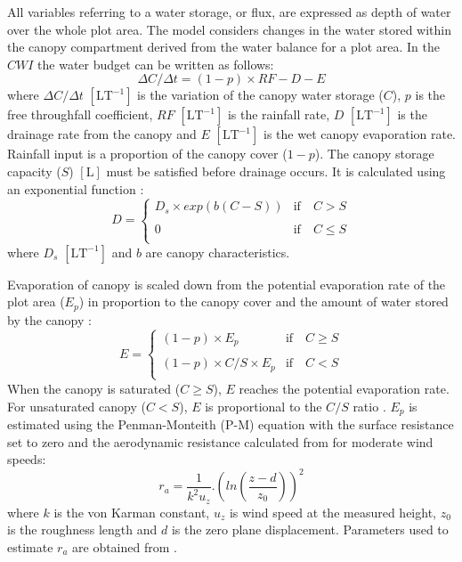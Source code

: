 \documentclass[a4paper,12pt]{article}
\begin{document}
All variables referring to a water storage, or flux, are expressed as depth of water over the whole plot area.
The model considers changes in the water stored within the canopy compartment derived from the water balance for a plot area. In the $CWI$ the water budget can be written as follows:
\begin{equation} \label{eq:fog_can_bal}
    \Delta C/\Delta t = (1 - p) \times RF - D - E 
\end{equation}
where $\Delta C/\Delta t$ $\mathrm{[LT^{-1}]}$ is the variation of the canopy water storage ($C$), $p$ is the free throughfall coefficient, $RF$ $\mathrm{[LT^{-1}]}$ is the rainfall rate, $D$ $\mathrm{[LT^{-1}]}$ is the drainage rate from the canopy and $E$ $\mathrm{[LT^{-1}]}$ is the wet canopy evaporation rate. Rainfall input is a proportion of the canopy cover ($1-p$). The canopy storage capacity ($S$) $\mathrm{[L]}$ must be satisfied before drainage occurs. It is calculated using an exponential function \citep{GashandMorton1978, Valenteetal1997, Pryetetal2012a}:
\begin{equation} \label{eq:fog_drainage}
D=%
  \begin{cases}
    D_s \times exp(b(C - S)) &  \mathrm{if} \quad C > S \\
    \\
    0 & \mathrm{if} \quad C \leq S \\
  \end{cases}
\end{equation}
where $D_s$ $\mathrm{[LT^{-1}]}$ and $b$ are canopy characteristics.

Evaporation of canopy is scaled down from the potential evaporation rate of the plot area ($E_p$) in proportion to the canopy cover and the amount of water stored by the canopy \citep{Pryetetal2012a}:
\begin{equation} \label{eq:fog_evaporation}
E=%
  \begin{cases}
    (1-p) \times E_p & \mathrm{if} \quad C \geq S \\
    \\
    (1-p) \times C/S \times E_p & \mathrm{if} \quad C < S \\
  \end{cases}
\end{equation}
When the canopy is saturated ($C \geq S$), $E$ reaches the potential evaporation rate. For unsaturated canopy ($C < S$), $E$ is proportional to the $C/S$ ratio \citep{Rutter1975, WhiteheadandKelliher1991, Valenteetal1997}. $E_p$ is estimated using the Penman-Monteith (P-M) equation \citep{Monteith1965} with the surface resistance set to zero \citep{Rutter1975, Kelliheretal1993} and the aerodynamic resistance calculated from \cite{Rutter1971,Rutter1975} for moderate wind speeds:
\begin{equation} \label{eq:ra}
    r_a = \dfrac{1}{k^2u_z}.\left(ln \left(\dfrac{z-d}{z_0} \right) \right)^2  
\end{equation}
where $k$ is the von Karman constant, $u_z$ is wind speed at the measured height, $z_0$ is the roughness length and $d$ is the zero plane displacement. Parameters used to estimate $r_a$ are obtained from \cite{Pryetetal2012a}.  
\end{document}
